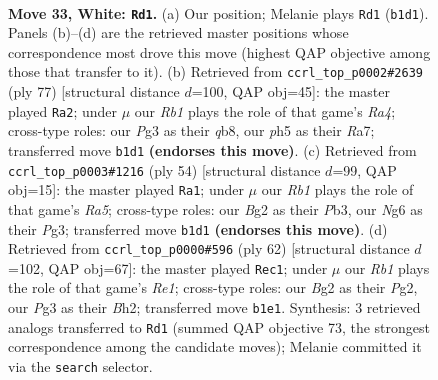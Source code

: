 \documentclass[11pt]{article}
\begin{document}
\clearpage

\begin{figure}[p]\centering
\begin{subfigure}{0.46\textwidth}\centering
\resizebox{\linewidth}{!}{%
\newchessgame
\chessboard[
  setfen={r2nk3/qp4p1/p4pN1/3Q2np/8/4P1P1/PP2RPBP/1R4K1 w - - 2 33},
  showmover=false,
  pgfstyle=straightmove, color=movearrow, markmove={b1-d1}
]}
\caption{}
\end{subfigure}\hfill
\begin{subfigure}{0.46\textwidth}\centering
\resizebox{\linewidth}{!}{%
\newchessgame
\chessboard[
  setfen={1Q6/r4pbk/4p2p/rpP2p2/1R1Pq3/5N1P/5PPK/1R6 b - - 19 39},
  showmover=false,
  pgfstyle=straightmove, color=movearrow, markmove={a5-a2}
]}
\caption{}
\end{subfigure}
\\[4pt]
\begin{subfigure}{0.46\textwidth}\centering
\resizebox{\linewidth}{!}{%
\newchessgame
\chessboard[
  setfen={4r1k1/1r1q2p1/2p4p/R1Bn1p2/2QP4/1P3RP1/5P1P/6K1 w - - 0 28},
  showmover=false,
  pgfstyle=straightmove, color=movearrow, markmove={a5-a1}
]}
\caption{}
\end{subfigure}\hfill
\begin{subfigure}{0.46\textwidth}\centering
\resizebox{\linewidth}{!}{%
\newchessgame
\chessboard[
  setfen={3rr1k1/1p5p/p3npp1/1q1p4/3P2Q1/1PR1P3/P4PPB/4R1K1 w - - 12 32},
  showmover=false,
  pgfstyle=straightmove, color=movearrow, markmove={e1-c1}
]}
\caption{}
\end{subfigure}
\caption{\textbf{Move 33, White: \texttt{Rd1}.} (a) Our position; Melanie plays \texttt{Rd1} (\texttt{b1d1}). Panels (b)--(d) are the retrieved master positions whose correspondence most drove this move (highest QAP objective among those that transfer to it). (b) Retrieved from \texttt{ccrl\_top\_p0002\#2639} (ply 77) [structural distance $d$=100, QAP obj=45]: the master played \texttt{Ra2}; under $\mu$ our \emph{Rb1} plays the role of that game's \emph{Ra4}; cross-type roles: our \emph{P}g3 as their \emph{q}b8, our \emph{p}h5 as their \emph{R}a7; transferred move \texttt{b1d1} \textbf{(endorses this move)}. (c) Retrieved from \texttt{ccrl\_top\_p0003\#1216} (ply 54) [structural distance $d$=99, QAP obj=15]: the master played \texttt{Ra1}; under $\mu$ our \emph{Rb1} plays the role of that game's \emph{Ra5}; cross-type roles: our \emph{B}g2 as their \emph{P}b3, our \emph{N}g6 as their \emph{P}g3; transferred move \texttt{b1d1} \textbf{(endorses this move)}. (d) Retrieved from \texttt{ccrl\_top\_p0000\#596} (ply 62) [structural distance $d$=102, QAP obj=67]: the master played \texttt{Rec1}; under $\mu$ our \emph{Rb1} plays the role of that game's \emph{Re1}; cross-type roles: our \emph{B}g2 as their \emph{P}g2, our \emph{P}g3 as their \emph{B}h2; transferred move \texttt{b1e1}. Synthesis: 3 retrieved analogs transferred to \texttt{Rd1} (summed QAP objective 73, the strongest correspondence among the candidate moves); Melanie committed it via the \texttt{search} selector.}
\label{fig:thought-m64}
\end{figure}
\end{document}
